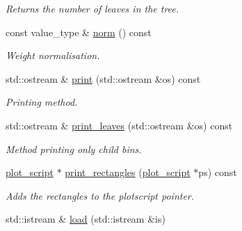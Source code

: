\begin{DoxyCompactItemize}
\begin{DoxyCompactList}\small\item\em Returns the number of leaves in the tree. \end{DoxyCompactList}\item 
\hypertarget{a00384_a80ae034628b872527969806af29914df}{const value\-\_\-type \& \hyperlink{a00384_a80ae034628b872527969806af29914df}{norm} () const }\label{a00384_a80ae034628b872527969806af29914df}

\begin{DoxyCompactList}\small\item\em Weight normalisation. \end{DoxyCompactList}\item 
\hypertarget{a00384_a15acd072593b2236a30136efff2b7d3a}{std\-::ostream \& \hyperlink{a00384_a15acd072593b2236a30136efff2b7d3a}{print} (std\-::ostream \&os) const }\label{a00384_a15acd072593b2236a30136efff2b7d3a}

\begin{DoxyCompactList}\small\item\em Printing method. \end{DoxyCompactList}\item 
\hypertarget{a00384_ae268ea90fd3aa641d8ca6b907f831809}{std\-::ostream \& \hyperlink{a00384_ae268ea90fd3aa641d8ca6b907f831809}{print\-\_\-leaves} (std\-::ostream \&os) const }\label{a00384_ae268ea90fd3aa641d8ca6b907f831809}

\begin{DoxyCompactList}\small\item\em Method printing only child bins. \end{DoxyCompactList}\item 
\hypertarget{a00384_a452b310723bfd4580c2698a0ef614d93}{\hyperlink{a00426}{plot\-\_\-script} $\ast$ \hyperlink{a00384_a452b310723bfd4580c2698a0ef614d93}{print\-\_\-rectangles} (\hyperlink{a00426}{plot\-\_\-script} $\ast$ps) const }\label{a00384_a452b310723bfd4580c2698a0ef614d93}

\begin{DoxyCompactList}\small\item\em Adds the rectangles to the plotscript pointer. \end{DoxyCompactList}\item 
\hypertarget{a00384_aace96f540b13613dc878de8bad2dfa1f}{std\-::istream \& \hyperlink{a00384_aace96f540b13613dc878de8bad2dfa1f}{load} (std\-::istream \&is)}\label{a00384_aace96f540b13613dc878de8bad2dfa1f}


\end{DoxyCompactItemize}
